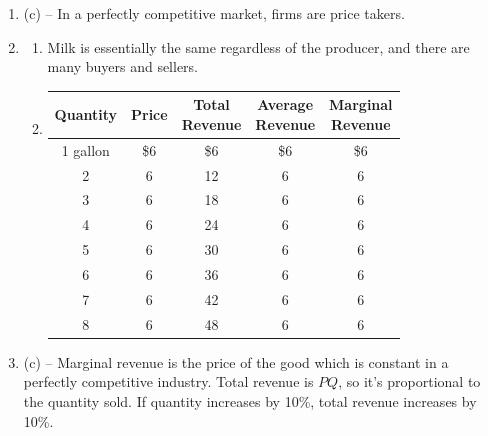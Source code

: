 \documentclass{article}
\begin{document}
\begin{enumerate}

	
\item (c) -- In a perfectly competitive market, firms are price takers.

\item

	\begin{enumerate}
	
	\item Milk is essentially the same regardless of the producer, and there are many buyers and sellers.
	
	\item
	
		\begin{center}
		\begin{tabular}{c | c | c | c | c }
		Quantity & Price & \makecell{Total\\Revenue} & \makecell{Average\\Revenue} & \makecell{Marginal\\Revenue} \\
		\hline
		1 gallon & \$6 & \$6 & \$6 & \$6 \\
		\hline
		2 & 6 & 12 & 6 & 6 \\
		\hline
		3 & 6 & 18 & 6 & 6 \\
		\hline
		4 & 6 & 24 & 6 & 6 \\
		\hline
		5 & 6 & 30 & 6 & 6 \\
		\hline
		6 & 6 & 36 & 6 & 6 \\
		\hline
		7 & 6 & 42 & 6 & 6 \\
		\hline
		8 & 6 & 48 & 6 & 6
		\end{tabular}
		\end{center}
	
	\end{enumerate}
	
\item (c) -- Marginal revenue is the price of the good which is constant in a perfectly competitive industry. Total revenue is $PQ$, so it's proportional to the quantity sold. If quantity increases by 10\%, total revenue increases by 10\%.

\end{enumerate}
\end{document}

